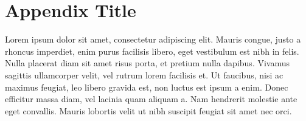 \chapter{Appendix Title}
Lorem ipsum dolor sit amet, consectetur adipiscing elit. Mauris congue, justo a rhoncus imperdiet, enim purus facilisis libero, eget vestibulum est nibh in felis. Nulla placerat diam sit amet risus porta, et pretium nulla dapibus. Vivamus sagittis ullamcorper velit, vel rutrum lorem facilisis et. Ut faucibus, nisi ac maximus feugiat, leo libero gravida est, non luctus est ipsum a enim. Donec efficitur massa diam, vel lacinia quam aliquam a. Nam hendrerit molestie ante eget convallis. Mauris lobortis velit ut nibh suscipit feugiat sit amet nec orci. 